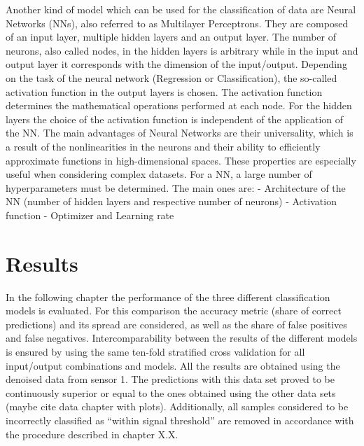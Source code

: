 \documentclass[12pt]{report}
\begin{document}
Another kind of model which can be used for the classification of data are Neural Networks (NNs), also referred to as Multilayer Perceptrons. They are composed of an input layer, multiple hidden layers and an output layer. The number of neurons, also called nodes, in the hidden layers is arbitrary while in the input and output layer it corresponds with the dimension of the input/output. Depending on the task of the neural network (Regression or Classification), the so-called activation function in the output layers is chosen. The activation function determines the mathematical operations performed at each node. For the hidden layers the choice of the activation function is independent of the application of the NN.
The main advantages of Neural Networks are their universality, which is a result of the nonlinearities in the neurons and their ability to efficiently approximate functions in high-dimensional spaces. These properties are especially useful when considering complex datasets.
For a NN, a large number of hyperparameters must be determined. The main ones are:\newline\newline
-	Architecture of the NN (number of hidden layers and respective number of neurons)\newline
-	Activation function\newline
-	Optimizer and Learning rate\newline\newline



\chapter{Results}
In the following chapter the performance of the three different classification models is evaluated. For this comparison the accuracy metric (share of correct predictions) and its spread are considered, as well as the share of false positives and false negatives.
Intercomparability between the results of the different models is ensured by using the same ten-fold stratified cross validation for all input/output combinations and models.
All the results are obtained using the denoised data from sensor 1. The predictions with this data set proved to be continuously superior or equal to the ones obtained using the other data sets (maybe cite data chapter with plots). 
Additionally, all samples considered to be incorrectly classified as “within signal threshold” are removed in accordance with the procedure described in chapter X.X.
\end{document}
